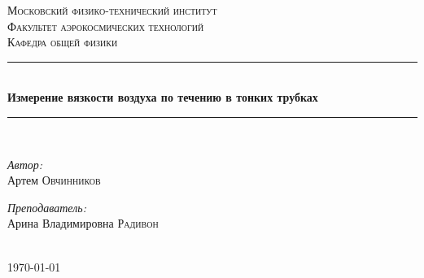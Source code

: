 \documentclass[1 pt]{article}
\begin{document}
\begin{titlepage}
\newcommand{\HRule}{\rule{\linewidth}{0.3 mm}} %

\center %
 

\textsc{\Large Московский физико-технический институт }\\[1.5cm] %
\textsc{\Large Факультет аэрокосмических технологий}\\[0.5cm] %
\textsc{\large Кафедра общей физики}\\[0.5cm] %


\HRule \\[0.4cm]
{ \huge \bfseries Измерение вязкости воздуха по
течению в тонких трубках }\\[0.4cm] %
\HRule \\[1.5cm]
 

\begin{minipage}{0.4\textwidth}
\begin{flushleft} \large
\emph{Автор:}\\ Артем \textsc{Овчинников} %
\end{flushleft}
\end{minipage}
\begin{minipage}{0.4\textwidth}
\begin{flushright} \large
\emph{Преподаватель:} \\
Арина Владимировна \textsc{Радивон} %
\end{flushright}
\end{minipage}\\[4cm]

{\large \today}\\[2cm] %


 

\vfill %

\end{titlepage}
\tableofcontents
\newpage
\end{document}
